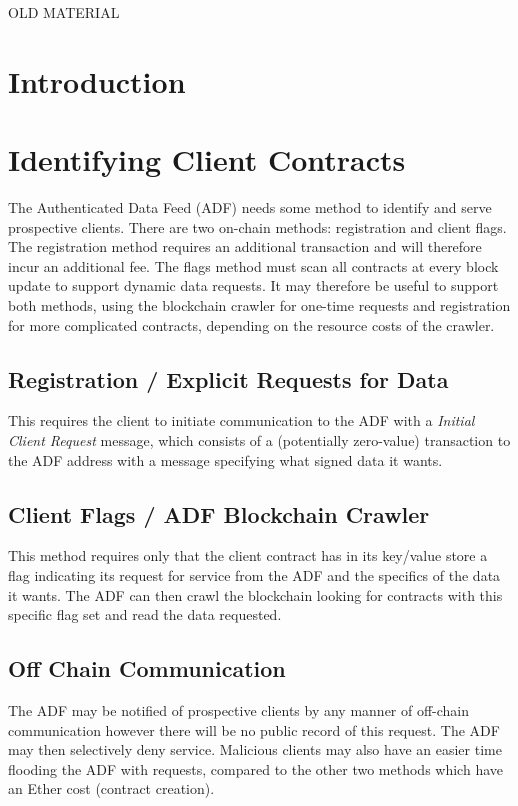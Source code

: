 \pagebreak
\appendix 

OLD MATERIAL

\section{Introduction}

\section{Identifying Client Contracts}
The Authenticated Data Feed (ADF) needs some method to identify and serve prospective clients.  There are two on-chain methods: registration and client flags.  The registration method requires an additional transaction and will therefore incur an additional fee.  The flags method must scan all contracts at every block update to support dynamic data requests.  It may therefore be useful to support both methods, using the blockchain crawler for one-time requests and registration for more complicated contracts, depending on the resource costs of the crawler.
\subsection{Registration / Explicit Requests for Data}
	This requires the client to initiate communication to the ADF with a \emph{Initial Client Request} message, which consists of a (potentially zero-value) transaction to the ADF address with a message specifying what signed data it wants. 
	
\subsection{Client Flags / ADF Blockchain Crawler}
	This method requires only that the client contract has in its key/value store a flag indicating its request for service from the ADF and the specifics of the data it wants.  The ADF can then crawl the blockchain looking for contracts with this specific flag set and read the data requested.
	
\subsection{Off Chain Communication}
	The ADF may be notified of prospective clients by any manner of off-chain communication however there will be no public record of this request.  The ADF may then selectively deny service.  Malicious clients may also have an easier time flooding the ADF with requests, compared to the other two methods which have an Ether cost (contract creation).\\

